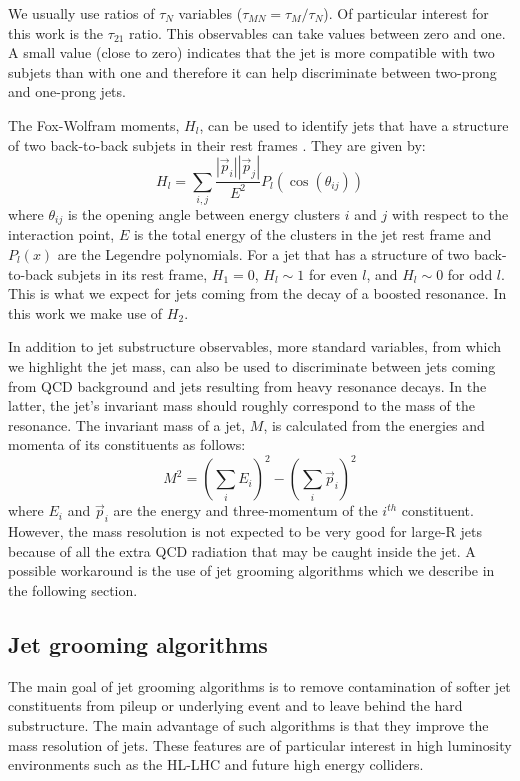 We usually use ratios of $\tau_N$ variables ($\tau_{MN}=\tau_M/\tau_N$). Of particular interest for this work is the $\tau_{21}$ ratio. This observables can take values between zero and one. A small value (close to zero) indicates that the jet is more compatible with two subjets than with one and therefore it can help discriminate between two-prong and one-prong jets.  

The Fox-Wolfram moments, $H_l$, can be used to identify jets that have a structure of two back-to-back subjets in their rest frames \cite{FW2}. They are given by:
\begin{equation}
H_l = \sum_{i,j}\frac{|\vec{p}_i||\vec{p}_j|}{E^2}P_l(\cos(\theta_{ij}))
\end{equation}  
where $\theta_{ij}$ is the opening angle between energy clusters $i$ and $j$ with respect to the interaction point, $E$ is the total energy of the clusters in the jet rest frame and $P_l(x)$ are the Legendre polynomials. For a jet that has a structure of two back-to-back subjets in its rest frame, $H_1 = 0$, $H_l \sim 1$ for even $l$, and $H_l \sim 0$ for odd $l$. This is what we expect for jets coming from the decay of a boosted resonance. In this work we make use of $H_2$.

In addition to jet substructure observables, more standard variables, from which we highlight the jet mass, can also be used to discriminate between jets coming from QCD background and jets resulting from heavy resonance decays. In the latter, the jet's invariant mass should roughly correspond to the mass of the resonance. The invariant mass of a jet, $M$, is  calculated from the energies and momenta of its constituents as follows:
\begin{equation}
	M^2=\left(\sum_{i}E_i\right)^2-\left(\sum_{i}\vec{p}_i\right)^2
\end{equation}
where $E_i$ and $\vec{p}_i$ are the energy and three-momentum of the $i^{th}$ constituent. However, the mass resolution is not expected to be very good for large-R jets because of all the extra QCD radiation that may be caught inside the jet. A possible workaround is the use of jet grooming algorithms which we describe in the following section.

\subsection{Jet grooming algorithms}
\label{section:jet_groom}

The main goal of jet grooming algorithms is to remove contamination of softer jet constituents from pileup or underlying event and to leave behind the hard substructure. The main advantage of such algorithms is that they improve the mass resolution of jets. These features are of particular interest in high luminosity environments such as the HL-LHC and future high energy colliders. 

